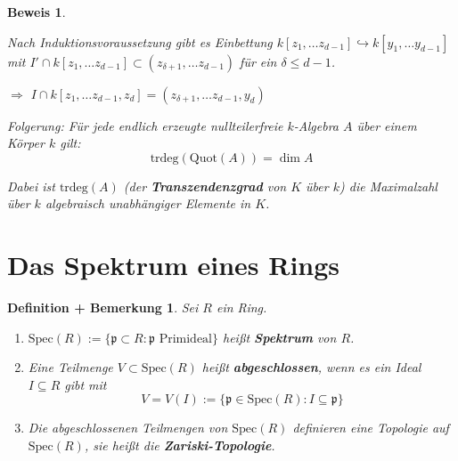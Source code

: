\documentclass[a4paper,12pt]{scrbook}
\theoremstyle{break}
\newtheorem{DefBem}[Def]{Definition + Bemerkung}
\theoremstyle{nonumberbreak}
\newtheorem{Bew}{Beweis}
\theoremstyle{nonumberplain}
\newcommand{\emp}[1]{\textbf{\emph{#1}}}
\begin{document}
\begin{Bew}
\begin{enumerate}
Nach Induktionsvoraussetzung gibt es Einbettung $k[z_1, \ldots z_{d-1}] \hookrightarrow k[y_1, \ldots y_{d-1}]$ mit $I' \cap k[z_1, \ldots z_{d-1}] \subset (z_{\delta+1}, \ldots z_{d-1})$ für ein $\delta \leq d-1$.

$\Rightarrow$ $I \cap k[z_1, \ldots z_{d-1}, z_d] = (z_{\delta+1}, \ldots z_{d-1}, y_d)$

Folgerung: Für jede endlich erzeugte nullteilerfreie $k$-Algebra $A$ über einem Körper $k$ gilt:
$$\text{trdeg}(\text{Quot}(A)) = \dim A$$

Dabei ist $\text{trdeg}(A)$ (der \emp{Transzendenzgrad} von $K$ über $k$) die Maximalzahl über $k$ algebraisch unabhängiger Elemente in $K$.

\end{enumerate}
\end{Bew}
\section{Das Spektrum eines Rings}

\begin{DefBem}
Sei $R$ ein Ring.

\begin{enumerate}
\item[a)] $\textrm{Spec}(R) := \{ \mathfrak{p} \subset R : \mathfrak{p} \text{ Primideal} \}$ heißt \emp{Spektrum} von $R$.

\item[b)] Eine Teilmenge $V \subset \textrm{Spec}(R)$ heißt \emp{abgeschlossen}, wenn es ein Ideal $I \subseteq R$ gibt mit
$$V = V(I) := \{ \mathfrak{p} \in \textrm{Spec}(R) : I \subseteq \mathfrak{p} \}$$

\item[c)] Die abgeschlossenen Teilmengen von $\textrm{Spec}(R)$ definieren eine Topologie auf $\textrm{Spec}(R)$, sie heißt die \emp{Zariski-Topologie}.

\end{enumerate}

\end{DefBem}
\end{document}
